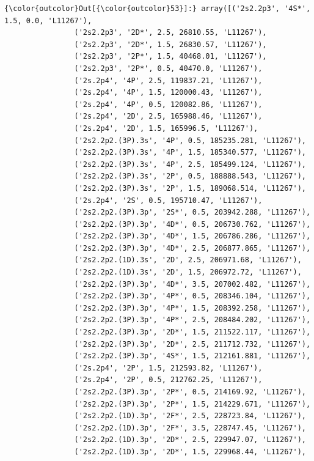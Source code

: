 \documentclass{report}
\begin{document}
            \begin{Verbatim}[commandchars=\\\{\}]
{\color{outcolor}Out[{\color{outcolor}53}]:} array([('2s2.2p3', '4S*', 1.5, 0.0, 'L11267'),
                ('2s2.2p3', '2D*', 2.5, 26810.55, 'L11267'),
                ('2s2.2p3', '2D*', 1.5, 26830.57, 'L11267'),
                ('2s2.2p3', '2P*', 1.5, 40468.01, 'L11267'),
                ('2s2.2p3', '2P*', 0.5, 40470.0, 'L11267'),
                ('2s.2p4', '4P', 2.5, 119837.21, 'L11267'),
                ('2s.2p4', '4P', 1.5, 120000.43, 'L11267'),
                ('2s.2p4', '4P', 0.5, 120082.86, 'L11267'),
                ('2s.2p4', '2D', 2.5, 165988.46, 'L11267'),
                ('2s.2p4', '2D', 1.5, 165996.5, 'L11267'),
                ('2s2.2p2.(3P).3s', '4P', 0.5, 185235.281, 'L11267'),
                ('2s2.2p2.(3P).3s', '4P', 1.5, 185340.577, 'L11267'),
                ('2s2.2p2.(3P).3s', '4P', 2.5, 185499.124, 'L11267'),
                ('2s2.2p2.(3P).3s', '2P', 0.5, 188888.543, 'L11267'),
                ('2s2.2p2.(3P).3s', '2P', 1.5, 189068.514, 'L11267'),
                ('2s.2p4', '2S', 0.5, 195710.47, 'L11267'),
                ('2s2.2p2.(3P).3p', '2S*', 0.5, 203942.288, 'L11267'),
                ('2s2.2p2.(3P).3p', '4D*', 0.5, 206730.762, 'L11267'),
                ('2s2.2p2.(3P).3p', '4D*', 1.5, 206786.286, 'L11267'),
                ('2s2.2p2.(3P).3p', '4D*', 2.5, 206877.865, 'L11267'),
                ('2s2.2p2.(1D).3s', '2D', 2.5, 206971.68, 'L11267'),
                ('2s2.2p2.(1D).3s', '2D', 1.5, 206972.72, 'L11267'),
                ('2s2.2p2.(3P).3p', '4D*', 3.5, 207002.482, 'L11267'),
                ('2s2.2p2.(3P).3p', '4P*', 0.5, 208346.104, 'L11267'),
                ('2s2.2p2.(3P).3p', '4P*', 1.5, 208392.258, 'L11267'),
                ('2s2.2p2.(3P).3p', '4P*', 2.5, 208484.202, 'L11267'),
                ('2s2.2p2.(3P).3p', '2D*', 1.5, 211522.117, 'L11267'),
                ('2s2.2p2.(3P).3p', '2D*', 2.5, 211712.732, 'L11267'),
                ('2s2.2p2.(3P).3p', '4S*', 1.5, 212161.881, 'L11267'),
                ('2s.2p4', '2P', 1.5, 212593.82, 'L11267'),
                ('2s.2p4', '2P', 0.5, 212762.25, 'L11267'),
                ('2s2.2p2.(3P).3p', '2P*', 0.5, 214169.92, 'L11267'),
                ('2s2.2p2.(3P).3p', '2P*', 1.5, 214229.671, 'L11267'),
                ('2s2.2p2.(1D).3p', '2F*', 2.5, 228723.84, 'L11267'),
                ('2s2.2p2.(1D).3p', '2F*', 3.5, 228747.45, 'L11267'),
                ('2s2.2p2.(1D).3p', '2D*', 2.5, 229947.07, 'L11267'),
                ('2s2.2p2.(1D).3p', '2D*', 1.5, 229968.44, 'L11267'),

\end{Verbatim}
\end{document}
